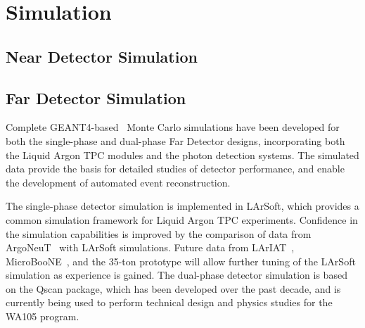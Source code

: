 \chapter{Simulation}
\label{annex:detectors-sc-physics-software-simulation}

\section{Near Detector Simulation}
\label{annex:detectors-sc-physics-software-simulation-nd}

\section{Far Detector Simulation}
\label{annex:detectors-sc-physics-software-simulation-fd}


%
%
%

Complete GEANT4-based~\cite{geant4} Monte Carlo simulations have been 
developed for both the single-phase and dual-phase Far Detector designs,
incorporating both the Liquid Argon TPC modules
and the photon detection systems. The simulated data provide
the basis for detailed studies of detector performance, 
and enable the development of automated event reconstruction.

The single-phase detector simulation is implemented in LArSoft,
which provides a common simulation framework for Liquid Argon TPC experiments.
Confidence in the simulation capabilities is improved by
the comparison of data from ArgoNeuT~\cite{argoneut} with LArSoft
simulations.  Future data from LArIAT~\cite{lariat},
MicroBooNE~\cite{microboone}, and the 35-ton prototype will allow
further tuning of the LArSoft simulation as experience is gained.
The dual-phase detector simulation is based on the Qscan package,
which has been developed over the past decade, and is currently
being used to perform technical design and physics studies for
the WA105 program.


